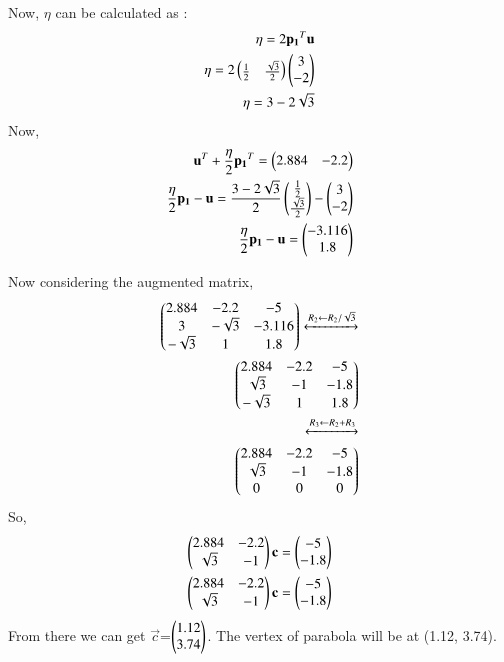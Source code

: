 \documentclass[journal,12pt,twocolumn]{IEEEtran}
\renewcommand\thesection{\arabic{section}}
\begin{document}
Now, $\eta$ can be calculated as : 
\begin{align}
\eta = 2 \mathbf{p_1}^T \mathbf{u}\\
\eta = 2 \begin{pmatrix}\frac{1}{2} & \frac{\sqrt{3}}{2}\end{pmatrix} \begin{pmatrix}3 \\ -2\end{pmatrix}\\
\eta =  3-2\sqrt{3}
\end{align}
Now, 
\begin{align}
\mathbf{u}^T + \frac{\eta}{2}\mathbf{p_1}^T = \begin{pmatrix}2.884 & -2.2\end{pmatrix}\\
\frac{\eta}{2} \mathbf{p_1} -\mathbf{u}= \frac{3-2\sqrt{3}}{2}\begin{pmatrix}\frac{1}{2}\\ \frac{\sqrt{3}}{2} \end{pmatrix} - \begin{pmatrix}3\\-2\end{pmatrix}\\
\frac{\eta}{2} \mathbf{p_1} -\mathbf{u}=\begin{pmatrix}-3.116\\1.8\end{pmatrix}
\end{align}

Now considering the augmented matrix,
\begin{align}
\begin{pmatrix}2.884 & -2.2 & -5\\3 & -\sqrt{3} & -3.116\\-\sqrt{3} & 1 & 1.8\end{pmatrix}\xleftrightarrow[]{R_2\leftarrow R_2/\sqrt{3}}\\
\begin{pmatrix}2.884 & -2.2 & -5\\\sqrt{3} & -1 & -1.8\\-\sqrt{3} & 1 & 1.8 \end{pmatrix}\\
\xleftrightarrow[]{R_3\leftarrow R_2+R_3}\\
\begin{pmatrix}2.884 & -2.2 & -5\\\sqrt{3} & -1 & -1.8\\0 & 0 & 0\end{pmatrix}
\end{align}
So, 
\begin{align}
\begin{pmatrix}2.884 & -2.2\\\sqrt{3} & -1\end{pmatrix}\mathbf{c}=\begin{pmatrix}-5\\-1.8\end{pmatrix}\\
\begin{pmatrix}2.884 & -2.2\\\sqrt{3} & -1\end{pmatrix}\mathbf{c}=\begin{pmatrix}-5\\-1.8\end{pmatrix}\\
\end{align}
From there we can get $\vec{c}$=$\begin{pmatrix}1.12\\3.74\end{pmatrix}$. The vertex of parabola will be at (1.12, 3.74).

\end{document}
